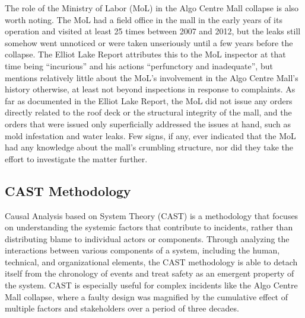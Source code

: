 \documentclass[12pt]{article}
\begin{document}
The role of the Ministry of Labor (MoL) in the Algo Centre Mall collapse is also worth noting. The MoL had a field office in the mall in the early years of its operation and visited at least 25 times between 2007 and 2012, but the leaks still somehow went unnoticed or were taken unseriously until a few years before the collapse. The Elliot Lake Report attributes this to the MoL inspector at that time being ``incurious'' and his actions ``perfunctory and inadequate'', but mentions relatively little about the MoL's involvement in the Algo Centre Mall's history otherwise, at least not beyond inspections in response to complaints. As far as documented in the Elliot Lake Report, the MoL did not issue any orders directly related to the roof deck or the structural integrity of the mall, and the orders that were issued only superficially addressed the issues at hand, such as mold infestation and water leaks. Few signs, if any, ever indicated that the MoL had any knowledge about the mall's crumbling structure, nor did they take the effort to investigate the matter further. 

\subsection{CAST Methodology}

Causal Analysis based on System Theory (CAST) is a methodology that focuses on understanding the systemic factors that contribute to incidents, rather than distributing blame to individual actors or components. Through analyzing the interactions between various components of a system, including the human, technical, and organizational elements, the CAST methodology is able to detach itself from the chronology of events and treat safety as an emergent property of the system. CAST is especially useful for complex incidents like the Algo Centre Mall collapse, where a faulty design was magnified by the cumulative effect of multiple factors and stakeholders over a period of three decades. 
\end{document}
